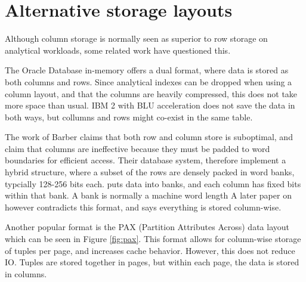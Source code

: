 \section{Alternative storage layouts}
\label{sec:Alternative storage layouts}
Although column storage is normally seen as superior to row storage on analytical workloads, some related work have questioned this.

The Oracle Database in-memory \cite{Lahiri2015-mz} offers a dual format, where data is stored as both columns and rows. Since analytical indexes can be dropped when using a column layout, and that the columns are heavily compressed, this does not take more space than usual. IBM 2 with BLU acceleration \cite{Raman2013-em} does not save the data in both ways, but collumns and rows might co-exist in the same table.

The work of Barber \ea \cite{Barber2012-xt} claims that both row and column store is suboptimal, and claim that columns are ineffective because they must be padded to word boundaries for efficient access. Their database system,  therefore implement a hybrid structure, where a subset of the rows are densely packed in word banks, typcially 128-256 bits each.  puts data into banks, and each column has fixed bits within that bank. A bank is normally a machine word length \cite{Johnson2008-cp} A later paper on  \cite{Raman2013-em} however contradicts this format, and says everything is stored column-wise.

Another popular format is the PAX (Partition Attributes Across) data layout \cite{Holloway2008-rr, Bjorklund2011-wh} which can be seen in Figure \ref{fig:pax}. This format allows for column-wise storage of tuples per page, and increases cache behavior. However, this does not reduce IO. Tuples are stored together in pages, but within each page, the data is stored in columns.

